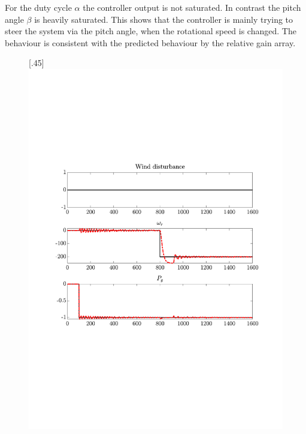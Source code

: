 For the duty cycle $\alpha$ the controller output is not saturated. 
In contrast the pitch angle $\beta$ is heavily saturated.
This shows that the controller is mainly trying to steer the system via the pitch angle, when the rotational speed is changed.
The behaviour is consistent with the predicted behaviour by the relative gain array.  

\begin{figure}[H]
    \centering

    [.45\textwidth]{\includegraphics[width=1\linewidth, scale=1, trim=60 230 55 150,clip]{fig/Open_loop/exp_1_ref.pdf}}
%

\end{figure}
